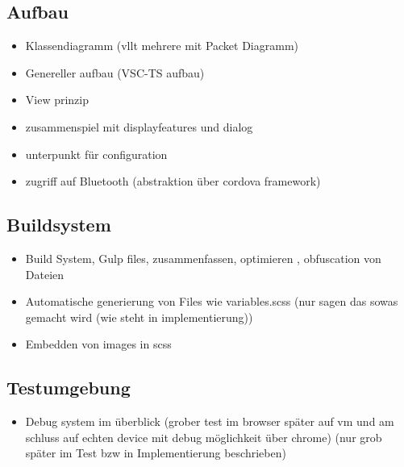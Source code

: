 \subsection{Aufbau}
\begin{itemize}
\item Klassendiagramm (vllt mehrere mit Packet Diagramm)
\item Genereller aufbau (VSC-TS aufbau)
\item View prinzip
\item zusammenspiel mit displayfeatures und dialog
\item unterpunkt für configuration
\item zugriff auf Bluetooth (abstraktion über cordova framework)
\end{itemize}

\subsection{Buildsystem}
\begin{itemize}
\item Build System, Gulp files, zusammenfassen, optimieren , obfuscation von Dateien
\item Automatische generierung von Files wie variables.scss (nur sagen das sowas gemacht wird (wie steht in implementierung))
\item Embedden von images in scss 
\end{itemize}
\subsection{Testumgebung}
\begin{itemize}
\item Debug system im überblick (grober test im browser später auf vm und am schluss auf echten device mit debug möglichkeit über chrome) (nur grob später im Test bzw in Implementierung beschrieben) 
\end{itemize}




